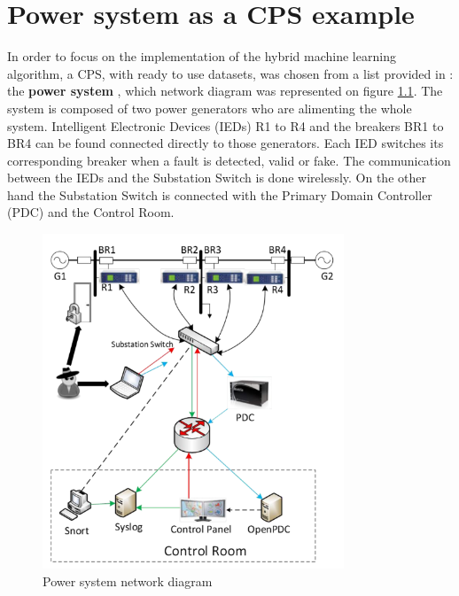 \chapter{Power system as a CPS example}
In order to focus on the implementation of the hybrid machine learning algorithm, a CPS, with ready to use datasets, was chosen from a list provided in \cite{morris_industrial_nodate}: the \textbf{power system} \cite{adhikari_power_2014}, which network diagram was represented on figure \ref{fig:cps_rep}. The system is composed of two power generators who are alimenting the whole system. Intelligent Electronic Devices (IEDs) R1 to R4 and the breakers BR1 to BR4 can be found connected directly to those generators. Each IED switches its corresponding breaker when a fault is detected, valid or fake. The communication between the IEDs and the Substation Switch is done wirelessly. On the other hand the Substation Switch is connected with the Primary Domain Controller (PDC) and the Control Room.

\begin{figure}[H]
    \centering
    \includegraphics[width=90mm]{images/cps_rep.png}
    \caption[Power system network diagram]{Power system network diagram \cite{adhikari_power_2014}}
    \label{fig:cps_rep}
\end{figure}

